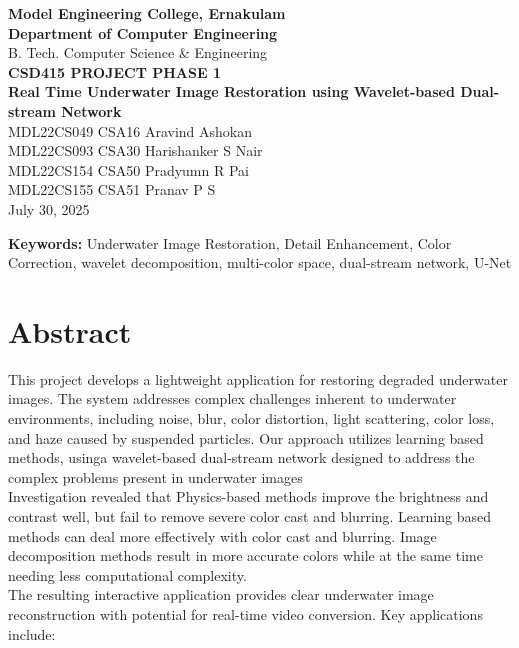 \documentclass[12pt]{article}
\begin{document}
\begin{center}
    \textbf{Model Engineering College, Ernakulam}\\[4pt]
    \textbf{Department of Computer Engineering}\\[4pt]
    B. Tech. Computer Science \& Engineering\\[4pt]
    \textbf{CSD415 PROJECT PHASE 1}\\[.5cm]
    
    \LARGE{\textbf{Real Time Underwater Image Restoration using Wavelet-based Dual-stream Network}}\\[.5cm]
    
    \large{MDL22CS049 CSA16 Aravind Ashokan}\\[4pt]
    \large{MDL22CS093 CSA30 Harishanker S Nair}\\[4pt]
    \large{MDL22CS154 CSA50 Pradyumn R Pai}\\[4pt]
    \large{MDL22CS155 CSA51 Pranav P S}\\[.5cm]
    
    \large{July 30, 2025}
\end{center}

\noindent\textbf{Keywords:} Underwater Image Restoration, Detail Enhancement, Color Correction, wavelet decomposition, multi-color space, dual-stream network, U-Net

\section*{Abstract}
This project develops a lightweight application for restoring degraded underwater images. The system addresses complex challenges inherent to underwater environments, including noise, blur, color distortion, light scattering, color loss, and haze caused by suspended particles. Our approach utilizes learning based methods, usinga wavelet-based dual-stream network designed to address the complex problems present in underwater images\\

Investigation revealed that Physics-based methods improve
the brightness and contrast well, but fail to remove severe color
cast and blurring. Learning based methods can deal more effectively with color cast and blurring. Image decomposition methods result in more accurate colors while at the same time needing less computational complexity.\\

The resulting interactive application provides clear underwater image reconstruction with potential for real-time video conversion. Key applications include:
\end{document}
